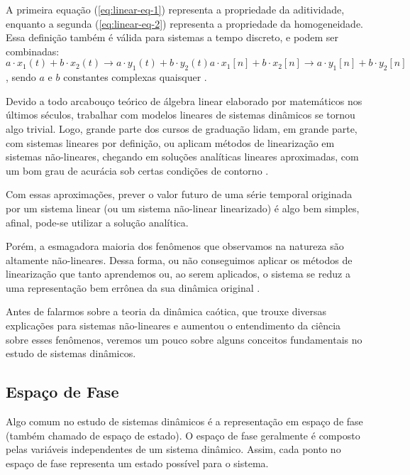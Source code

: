 \documentclass[a4paper, 12pt]{article}
\begin{document}
A primeira equação (\ref{eq:linear-eq-1}) representa a propriedade da aditividade, enquanto a segunda (\ref{eq:linear-eq-2}) representa a propriedade da homogeneidade. Essa definição também é válida para sistemas a tempo discreto, e podem ser combinadas:
\begin{subequations}
\begin{equation}
a \cdot x_1(t) + b \cdot x_2(t) \rightarrow a \cdot y_1(t) + b \cdot y_2(t)
\end{equation}
\begin{equation}
a \cdot x_1[n] + b \cdot x_2[n] \rightarrow a \cdot y_1[n] + b \cdot y_2[n]
\end{equation}
\end{subequations}
, sendo $a$ e $b$ constantes complexas quaisquer \cite{oppenheim2014signals}.

Devido a todo arcabouço teórico de álgebra linear elaborado por matemáticos nos últimos séculos, trabalhar com modelos lineares de sistemas dinâmicos se tornou algo trivial. Logo, grande parte dos cursos de graduação lidam, em grande parte, com sistemas lineares por definição, ou aplicam métodos de linearização em sistemas não-lineares, chegando em soluções analíticas lineares aproximadas, com um bom grau de acurácia sob certas condições de contorno \cite{fiedler1994caos}. 

Com essas aproximações, prever o valor futuro de uma série temporal originada por um sistema linear (ou um sistema não-linear linearizado) é algo bem simples, afinal, pode-se utilizar a solução analítica.

Porém, a esmagadora maioria dos fenômenos que observamos na natureza são altamente não-lineares. Dessa forma, ou não conseguimos aplicar os métodos de linearização que tanto aprendemos ou, ao serem aplicados, o sistema se reduz a uma representação bem errônea da sua dinâmica original \cite{gleick2008chaos}.

Antes de falarmos sobre a teoria da dinâmica caótica, que trouxe diversas explicações para sistemas não-lineares e aumentou o entendimento da ciência sobre esses fenômenos, veremos um pouco sobre alguns conceitos fundamentais no estudo de sistemas dinâmicos.

\subsection{Espaço de Fase}
Algo comum no estudo de sistemas dinâmicos é a representação em espaço de fase (também chamado de espaço de estado). O espaço de fase geralmente é composto pelas variáveis independentes de um sistema dinâmico. Assim, cada ponto no espaço de fase representa um estado possível para o sistema.
\end{document}
